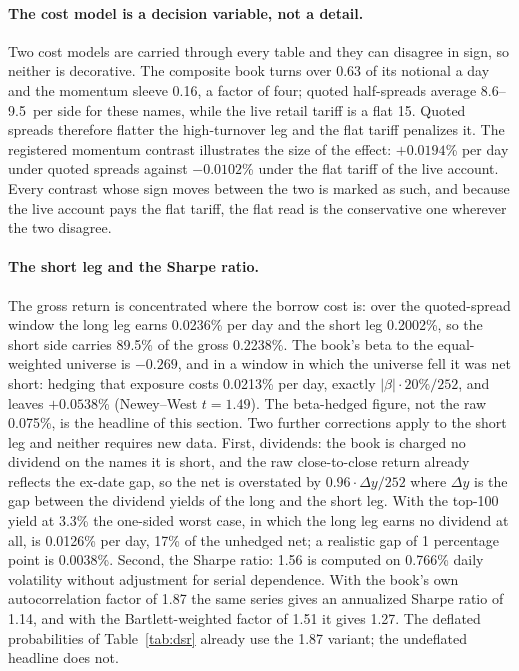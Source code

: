 \paragraph{The cost model is a decision variable, not a detail.} Two cost models are carried through every table and they can disagree in sign, so neither is decorative. The composite book turns over 0.63 of its notional a day and the momentum sleeve 0.16, a factor of four; quoted half-spreads average 8.6--9.5\bp\ per side for these names, while the live retail tariff is a flat 15\bp. Quoted spreads therefore flatter the high-turnover leg and the flat tariff penalizes it. The registered momentum contrast illustrates the size of the effect: $+0.0194$\% per day under quoted spreads against $-0.0102$\% under the flat tariff of the live account. Every contrast whose sign moves between the two is marked as such, and because the live account pays the flat tariff, the flat read is the conservative one wherever the two disagree.

\paragraph{The short leg and the Sharpe ratio.} The gross return is concentrated where the borrow cost is: over the quoted-spread window the long leg earns 0.0236\% per day and the short leg 0.2002\%, so the short side carries 89.5\% of the gross 0.2238\%. The book's beta to the equal-weighted universe is $-0.269$, and in a window in which the universe fell it was net short: hedging that exposure costs 0.0213\% per day, exactly $|\beta|\cdot20\%/252$, and leaves $+0.0538$\% (Newey--West $t=1.49$). The beta-hedged figure, not the raw 0.075\%, is the headline of this section. Two further corrections apply to the short leg and neither requires new data. First, dividends: the book is charged no dividend on the names it is short, and the raw close-to-close return already reflects the ex-date gap, so the net is overstated by $0.96\cdot\Delta y/252$ where $\Delta y$ is the gap between the dividend yields of the long and the short leg. With the top-100 yield at 3.3\% the one-sided worst case, in which the long leg earns no dividend at all, is 0.0126\% per day, 17\% of the unhedged net; a realistic gap of 1 percentage point is 0.0038\%. Second, the Sharpe ratio: 1.56 is computed on 0.766\% daily volatility without adjustment for serial dependence. With the book's own autocorrelation factor of 1.87 the same series gives an annualized Sharpe ratio of 1.14, and with the Bartlett-weighted factor of 1.51 it gives 1.27. The deflated probabilities of Table~\ref{tab:dsr} already use the 1.87 variant; the undeflated headline does not.


